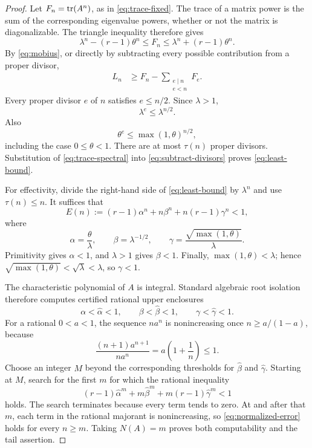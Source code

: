 \begin{proof}
Let $F_n=\operatorname{tr}(A^n)$, as in \cref{eq:trace-fixed}.  The trace of a matrix power
is the sum of the corresponding eigenvalue powers, whether or not the matrix
is diagonalizable.  The triangle inequality therefore gives
\begin{equation}
 \lambda^n-(r-1)\theta^n
 \le F_n
 \le \lambda^n+(r-1)\theta^n.
 \label{eq:trace-spectral}
\end{equation}
By \cref{eq:mobius}, or directly by subtracting every possible contribution
from a proper divisor,
\begin{align}
 L_n
 &\ge F_n-\sum_{\substack{e\mid n\\e<n}}F_e. 
 \label{eq:subtract-divisors}
\end{align}
Every proper divisor $e$ of $n$ satisfies $e\le n/2$.  Since $\lambda>1$,
\[
 \lambda^e\le\lambda^{n/2}.
\]
Also
\[
 \theta^e\le \max(1,\theta)^{n/2},
\]
including the case $0\le\theta<1$.  There are at most $\tau(n)$ proper
divisors.  Substitution of \cref{eq:trace-spectral} into
\cref{eq:subtract-divisors} proves \cref{eq:least-bound}.

For effectivity, divide the right-hand side of \cref{eq:least-bound} by
$\lambda^n$ and use $\tau(n)\le n$.  It suffices that
\begin{equation}
 E(n):=(r-1)\alpha^n+n\beta^n+n(r-1)\gamma^n<1,
 \label{eq:normalized-error}
\end{equation}
where
\begin{equation}
 \alpha=\frac{\theta}{\lambda},\qquad
 \beta=\lambda^{-1/2},\qquad
 \gamma=\frac{\sqrt{\max(1,\theta)}}{\lambda}.
 \label{eq:error-bases}
\end{equation}
Primitivity gives $\alpha<1$, and $\lambda>1$ gives $\beta<1$.  Finally,
$\max(1,\theta)<\lambda$; hence
$\sqrt{\max(1,\theta)}<\sqrt\lambda<\lambda$, so $\gamma<1$.

The characteristic polynomial of $A$ is integral.  Standard algebraic root
isolation therefore computes certified rational upper enclosures
\[
 \alpha<\widehat\alpha<1,\qquad
 \beta<\widehat\beta<1,\qquad
 \gamma<\widehat\gamma<1.
\]
For a rational $0<a<1$, the sequence $na^n$ is nonincreasing once
$n\ge a/(1-a)$, because
\[
 \frac{(n+1)a^{n+1}}{na^n}=a\left(1+\frac1n\right)\le1.
\]
Choose an integer $M$ beyond the corresponding thresholds for
$\widehat\beta$ and $\widehat\gamma$.  Starting at $M$, search for the first
$m$ for which the rational inequality
\begin{equation}
 (r-1)\widehat\alpha^m+m\widehat\beta^m
 +m(r-1)\widehat\gamma^m<1
 \label{eq:rational-certificate}
\end{equation}
holds.  The search terminates because every term tends to zero.  At and after
that $m$, each term in the rational majorant is nonincreasing, so
\cref{eq:normalized-error} holds for every $n\ge m$.  Taking $N(A)=m$ proves
both computability and the tail assertion.
\end{proof}

